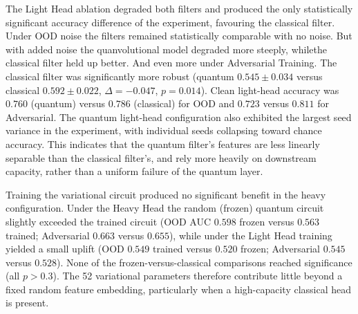 The Light Head ablation degraded both filters and produced the only statistically significant accuracy difference of the experiment, favouring the classical filter. Under OOD noise the filters remained statistically comparable with no noise. But with added noise the quanvolutional model degraded more steeply, whilethe classical filter held up better.
And even more under Adversarial Training. The classical filter was significantly more robust (quantum \(0.545 \pm 0.034\) versus classical \(0.592 \pm 0.022\), \(\Delta = -0.047\), \(p = 0.014\)). Clean light-head accuracy was \(0.760\) (quantum) versus \(0.786\) (classical) for OOD and \(0.723\) versus \(0.811\) for Adversarial. The quantum light-head configuration also exhibited the largest seed variance in the experiment, with individual seeds collapsing toward chance accuracy. This indicates that the quantum filter's features are less linearly separable than the classical filter's, and rely more heavily on downstream capacity, rather than a uniform failure of the quantum layer.

Training the variational circuit produced no significant benefit in the heavy configuration. Under the Heavy Head the random (frozen) quantum circuit slightly exceeded the trained circuit (OOD AUC \(0.598\) frozen versus \(0.563\) trained; Adversarial \(0.663\) versus \(0.655\)), while under the Light Head training yielded a small uplift (OOD \(0.549\) trained versus \(0.520\) frozen; Adversarial \(0.545\) versus \(0.528\)). None of the frozen-versus-classical comparisons reached significance (all \(p > 0.3\)). The 52 variational parameters therefore contribute little beyond a fixed random feature embedding, particularly when a high-capacity classical head is present.


